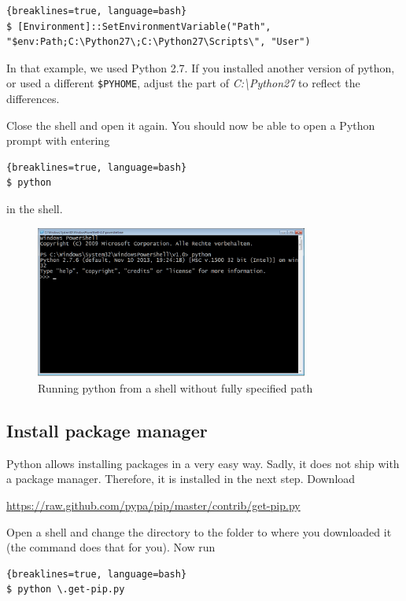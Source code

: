 \begin{lstlisting}{breaklines=true, language=bash}
$ [Environment]::SetEnvironmentVariable("Path", "$env:Path;C:\Python27\;C:\Python27\Scripts\", "User")
\end{lstlisting}

In that example, we used Python 2.7. If you installed another version of python, or used a different \texttt{\$PYHOME}, adjust the part of \textit{C:\textbackslash Python27} to reflect the differences. 

Close the shell and open it again. You should now be able to open a Python prompt with entering

\begin{lstlisting}{breaklines=true, language=bash}
$ python
\end{lstlisting}

in the shell. 

\begin{figure}[ht]
    \centering
    \includegraphics[width=0.8\textwidth]{img/install-python.png}
    \caption{Running python from a shell without fully specified path}
    \label{fig:install-python}
\end{figure}

\subsection{Install package manager}

Python allows installing packages in a very easy way. Sadly, it does not ship with a package manager. Therefore, it is installed in the next step. Download

\url{https://raw.github.com/pypa/pip/master/contrib/get-pip.py}

Open a shell and change the directory to the folder to where you downloaded it (the  command does that for you). Now run 

\begin{lstlisting}{breaklines=true, language=bash}
$ python \.get-pip.py
\end{lstlisting}

